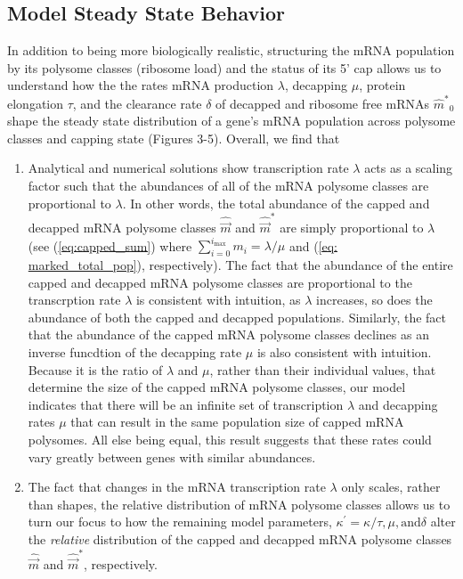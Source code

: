 \documentclass[review]{elsarticle}
\newcommand\mmpar[1]{\marginpar{\begin{spacing}{0.7}\raggedright \singlespacing \tiny \textbf{M:} #1 \end{spacing}}}  %
\newcommand{\imax}{\ensuremath{{i_{\max}}}\xspace}
\newcommand{\kappaprime}{\ensuremath{\kappa^{\prime}}\xspace}
\newcommand{\mhat}{\ensuremath{\hat{m}}\xspace}
\newcommand{\mhatstar}{\ensuremath{\mhat^{*}}\xspace}
\newcommand{\mvec}{\ensuremath{\vec{m}}\xspace}
\newcommand{\mvechat}{\ensuremath{\hat{\mvec}}\xspace}
\newcommand{\mvechatstar}{\ensuremath{\mvechat^*}\xspace}
\begin{document}
\subsection*{Model Steady State Behavior}

In addition to being more biologically realistic, structuring the mRNA population by its polysome classes (ribosome load) and the status of its 5' cap allows us to understand how the the rates mRNA production $\lambda$, decapping $\mu$, protein elongation $\tau$, and the clearance rate $\delta$ of decapped and ribosome free mRNAs $\mhatstar_0$ shape the steady state distribution of a gene's mRNA population across polysome classes and capping state (Figures 3-5).
Overall, we find that 

\begin{enumerate}
\item Analytical and numerical solutions show transcription rate $\lambda$ acts as a scaling factor such that the abundances
  of all of the mRNA polysome classes are proportional to $\lambda$.
  In other words, the total abundance of the capped and decapped mRNA polysome classes $\mvechat$ and $\mvechatstar$ are simply proportional to $\lambda$ (see (\ref{eq:capped_sum}) where $\sum_{i = 0} ^\imax m_i = \lambda/\mu$ and (\ref{eq: marked_total_pop}), respectively).
  The fact that the abundance of the entire capped and decapped mRNA polysome classes are proportional to the transcrption rate $\lambda$ is consistent with intuition, as $\lambda$ increases, so does the abundance of both the capped and decapped populations.
  Similarly, the fact that the abundance of the capped mRNA polysome classes declines as an inverse funcdtion of the decapping rate $\mu$ is also consistent with intuition.
  Because it is the ratio of $\lambda$ and $\mu$, rather than their individual values, that determine the size of the capped mRNA polysome classes, our model indicates that there will be an infinite set of transcription $\lambda$ and decapping rates $\mu$ that can result in the same population size of capped mRNA polysomes.
  All else being equal, this result suggests that these rates could vary greatly between genes with similar abundances.
\item The fact that changes in the mRNA transcription rate  $\lambda$ only scales, rather than shapes, the relative distribution of mRNA polysome classes allows us to turn our focus to how the remaining model parameters, $\kappaprime = \kappa/\tau, \mu, \text{and} \delta$ alter the \emph{relative} distribution of the capped and decapped mRNA polysome classes \mvechat and \mvechatstar, respectively.

\end{enumerate}
\end{document}
